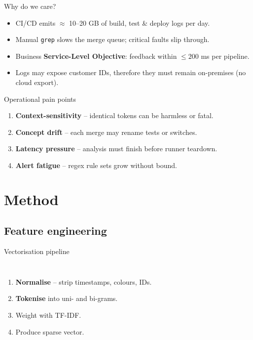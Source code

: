 \documentclass[15pt,aspectratio=169]{beamer}
\newcommand{\tfidf}{TF-IDF\xspace}
\newcommand{\src}[1]{\footnotesize\cite{#1}}
\begin{document}
\begin{frame}{Why do we care?}
\begin{itemize}[<+->]
  \item CI/CD emits \alert{$\approx$ 10--20 GB} of build, test \& deploy logs per day. \src{splunkObservability2023}
  \item Manual \texttt{grep} slows the merge queue; critical faults slip through.
  \item Business \textbf{Service-Level Objective}: feedback within \alert{$\le 200$ ms} per pipeline.
  \item Logs may expose customer IDs, therefore they must remain on-premises (no cloud export).
\end{itemize}
\end{frame}

\begin{frame}{Operational pain points}
\begin{enumerate}[<+->]
  \item \textbf{Context-sensitivity} -- identical tokens can be harmless or fatal.
  \item \textbf{Concept drift} -- each merge may rename tests or switches. \src{Gama2014CD}
  \item \textbf{Latency pressure} -- analysis must finish before runner teardown.
  \item \textbf{Alert fatigue} -- regex rule sets grow without bound. \src{XuLogSurvey2021}
\end{enumerate}
\end{frame}

\section{Method}

\subsection{Feature engineering}
\begin{frame}{Vectorisation pipeline }
\begin{columns}
    \begin{enumerate}[<+->]
      \item \textbf{Normalise} -- strip timestamps, colours, IDs.
      \item \textbf{Tokenise} into uni- and bi-grams.
      \item Weight with \tfidf.
      \item Produce sparse vector.
    \end{enumerate}
    \centering
\end{columns}
\end{frame}
\end{document}
